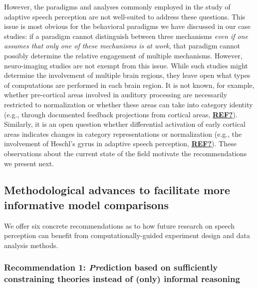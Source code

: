 \documentclass[
  11pt,
  english,
  man,floatsintext]{apa6}
\begin{document}
However, the paradigms and analyses commonly employed in the study of adaptive speech perception are not well-suited to address these questions. This issue is most obvious for the behavioral paradigms we have discussed in our case studies: if a paradigm cannot distinguish between three mechanisms \emph{even if one assumes that only one of these mechanisms is at work}, that paradigm cannot possibly determine the relative engagement of multiple mechanisms. However, neuro-imaging studies are not exempt from this issue. While such studies might determine the involvement of multiple brain regions, they leave open what types of computations are performed in each brain region. It is not known, for example, whether pre-cortical areas involved in auditory processing are necessarily restricted to normalization or whether these areas can take into category identity (e.g., through documented feedback projections from cortical areas, \protect\hyperlink{ref-REF}{\textbf{REF?}}). Similarly, it is an open question whether differential activation of early cortical areas indicates changes in category representations or normalization (e.g., the involvement of Heschl's gyrus in adaptive speech perception, \protect\hyperlink{ref-REF}{\textbf{REF?}}). These observations about the current state of the field motivate the recommendations we present next.

\hypertarget{sec:methodological-advances}{%
\subsection{Methodological advances to facilitate more informative model comparisons}\label{sec:methodological-advances}}

We offer six concrete recommendations as to how future research on speech perception can benefit from computationally-guided experiment design and data analysis methods.

\hypertarget{recommendation-1-prediction-based-on-sufficiently-constraining-theories-instead-of-only-informal-reasoning}{%
\subsubsection{\texorpdfstring{Recommendation 1: \emph{Pre}diction based on sufficiently constraining theories instead of (only) informal reasoning}{Recommendation 1: Prediction based on sufficiently constraining theories instead of (only) informal reasoning}}\label{recommendation-1-prediction-based-on-sufficiently-constraining-theories-instead-of-only-informal-reasoning}}
\end{document}
